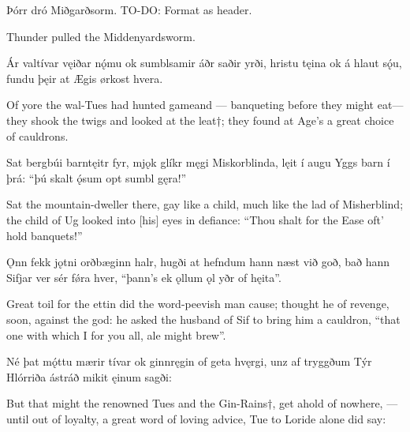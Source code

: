 Þórr dró Miðgarðsorm. TO-DO: Format as header.

Thunder pulled the Middenyardsworm.\footnotemark[1]

Ár valtívar \hld vęiðar nǫ́mu
ok sumblsamir \hld áðr saðir yrði,
hristu tęina \hld ok á hlaut sǫ́u,
fundu þęir at Ægis \hld ørkost hvera.

Of yore the wal-Tues had hunted game\footnotemark[1] and — banqueting before they might eat\footnotemark[1] — they shook the twigs and looked at the leat†\footnotemark[3]; they found at Age’s a great choice of cauldrons.\footnotemark[4]

Sat bergbúi \hld barntęitr fyr,
mjǫk glíkr męgi \hld Miskorblinda,
lęit í augu \hld Yggs barn í þrá:
“þú skalt ǫ́sum \hld opt sumbl gęra!”

Sat the mountain-dweller there, gay like a child, much like the lad of Misherblind; the child of Ug looked into [his] eyes in defiance: “Thou shalt for the Ease oft’ hold banquets!”

Ǫnn fekk jǫtni \hld orðbæginn halr,
hugði at hefndum \hld hann næst við goð,
bað hann Sifjar ver \hld sér fǿra hver,
“þann’s ek ǫllum ǫl \hld yðr of hęita”.

Great toil for the ettin did the word-peevish man cause; thought he of revenge, soon, against the god: he asked the husband of Sif to bring him a cauldron, “that one with which I for you all, ale might brew”.

Né þat mǫ́ttu \hld mærir tívar
ok ginnręgin \hld of geta hvęrgi,
unz af tryggðum \hld Týr Hlórriða
ástráð mikit \hld ęinum sagði:

But that might the renowned Tues and the Gin-Rains†, get ahold of nowhere, — until out of loyalty, a great word of loving advice, Tue to Loride alone did say:
